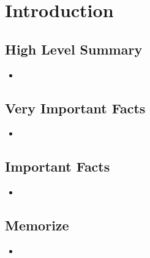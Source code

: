 \section{Introduction}

\subsection{High Level Summary}

    \begin{itemize}

    \item 
    
    \end{itemize}

\subsection{Very Important Facts}

    \begin{itemize}

    \item 
    
    \end{itemize}

\subsection{Important Facts}

    \begin{itemize}

    \item 
    
    \end{itemize}

\subsection{Memorize}

    \begin{itemize}

    \item 
    
    \end{itemize}


